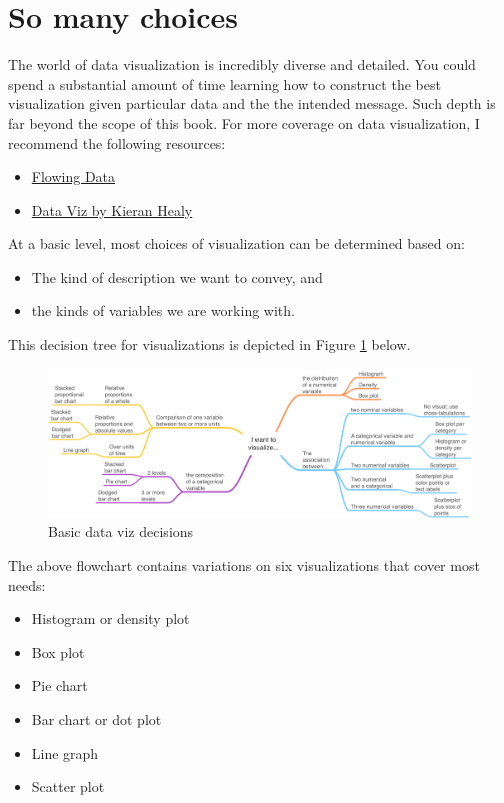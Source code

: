 \documentclass[
]{book}
\providecommand{\tightlist}{%
  \setlength{\itemsep}{0pt}\setlength{\parskip}{0pt}}
\begin{document}
\hypertarget{so-many-choices}{%
\section{So many choices}\label{so-many-choices}}

The world of data visualization is incredibly diverse and detailed. You could spend a substantial amount of time learning how to construct the best visualization given particular data and the the intended message. Such depth is far beyond the scope of this book. For more coverage on data visualization, I recommend the following resources:

\begin{itemize}
\tightlist
\item
  \href{https://flowingdata.com}{Flowing Data}
\item
  \href{https://socviz.co/index.html\#preface}{Data Viz by Kieran Healy}
\end{itemize}

At a basic level, most choices of visualization can be determined based on:

\begin{itemize}
\tightlist
\item
  The kind of description we want to convey, and
\item
  the kinds of variables we are working with.
\end{itemize}

This decision tree for visualizations is depicted in Figure \ref{fig:vizflow} below.

\begin{figure}
\includegraphics[width=21.61in]{images/vizflow} \caption{Basic data viz decisions}\label{fig:vizflow}
\end{figure}

The above flowchart contains variations on six visualizations that cover most needs:

\begin{itemize}
\tightlist
\item
  Histogram or density plot
\item
  Box plot
\item
  Pie chart
\item
  Bar chart or dot plot
\item
  Line graph
\item
  Scatter plot
\end{itemize}
\end{document}
